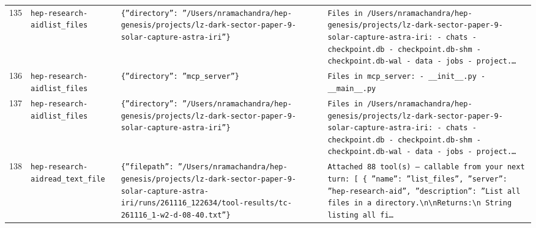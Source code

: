 \documentclass[11pt,a4paper]{article}
\begin{document}
\begin{longtable}{@{}p{}p{}p{}p{}@{}}
135 & \texttt{hep-research-aid}\newline\texttt{list\_\allowbreak{}files} & \texttt{\{''directory'':\allowbreak{} ''/\allowbreak{}Users/\allowbreak{}nramachandra/\allowbreak{}hep-genesis/\allowbreak{}projects/\allowbreak{}lz-dark-sector-paper-9-solar-capture-astra-iri''\}\allowbreak{}} & \texttt{Files in /\allowbreak{}Users/\allowbreak{}nramachandra/\allowbreak{}hep-genesis/\allowbreak{}projects/\allowbreak{}lz-dark-sector-paper-9-solar-capture-astra-iri:\allowbreak{}   - chats   - checkpoint.db   - checkpoint.db-shm   - checkpoint.db-wal   - data   - jobs   - project.\ldots{}\allowbreak{}} \\
136 & \texttt{hep-research-aid}\newline\texttt{list\_\allowbreak{}files} & \texttt{\{''directory'':\allowbreak{} ''mcp\_\allowbreak{}server''\}\allowbreak{}} & \texttt{Files in mcp\_\allowbreak{}server:\allowbreak{}   - \_\allowbreak{}\_\allowbreak{}init\_\allowbreak{}\_\allowbreak{}.py   - \_\allowbreak{}\_\allowbreak{}main\_\allowbreak{}\_\allowbreak{}.py} \\
137 & \texttt{hep-research-aid}\newline\texttt{list\_\allowbreak{}files} & \texttt{\{''directory'':\allowbreak{} ''/\allowbreak{}Users/\allowbreak{}nramachandra/\allowbreak{}hep-genesis/\allowbreak{}projects/\allowbreak{}lz-dark-sector-paper-9-solar-capture-astra-iri''\}\allowbreak{}} & \texttt{Files in /\allowbreak{}Users/\allowbreak{}nramachandra/\allowbreak{}hep-genesis/\allowbreak{}projects/\allowbreak{}lz-dark-sector-paper-9-solar-capture-astra-iri:\allowbreak{}   - chats   - checkpoint.db   - checkpoint.db-shm   - checkpoint.db-wal   - data   - jobs   - project.\ldots{}\allowbreak{}} \\
138 & \texttt{hep-research-aid}\newline\texttt{read\_\allowbreak{}text\_\allowbreak{}file} & \texttt{\{''filepath'':\allowbreak{} ''/\allowbreak{}Users/\allowbreak{}nramachandra/\allowbreak{}hep-genesis/\allowbreak{}projects/\allowbreak{}lz-dark-sector-paper-9-solar-capture-astra-iri/\allowbreak{}runs/\allowbreak{}261116\_\allowbreak{}122634/\allowbreak{}tool-results/\allowbreak{}tc-261116\_\allowbreak{}1-w2-d-08-40.txt''\}\allowbreak{}} & \texttt{Attached 88 tool(s)\allowbreak{} --- callable from your next turn:\allowbreak{} [  \{   ''name'':\allowbreak{} ''list\_\allowbreak{}files'',\allowbreak{}   ''server'':\allowbreak{} ''hep-research-aid'',\allowbreak{}   ''description'':\allowbreak{} ''List all files in a directory.\textbackslash{}\allowbreak{}n\textbackslash{}\allowbreak{}nReturns:\allowbreak{}\textbackslash{}\allowbreak{}n    String listing all fi\ldots{}\allowbreak{}} \\

\end{longtable}
\end{document}
